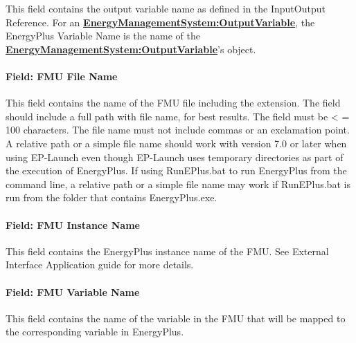 This field contains the output variable name as defined in the InputOutput Reference. For an \textbf{\hyperref[energymanagementsystemoutputvariable]{EnergyManagementSystem:OutputVariable}}, the EnergyPlus Variable Name is the name of the \textbf{\hyperref[energymanagementsystemoutputvariable]{EnergyManagementSystem:OutputVariable}}'s object.

\paragraph{Field: FMU File Name}\label{field-fmu-file-name-1}

This field contains the name of the FMU file including the extension. The field should include a full path with file name, for best results. The field must be \textless{} = 100 characters. The file name must not include commas or an exclamation point. A relative path or a simple file name should work with version 7.0 or later when using EP-Launch even though EP-Launch uses temporary directories as part of the execution of EnergyPlus. If using RunEPlus.bat to run EnergyPlus from the command line, a relative path or a simple file name may work if RunEPlus.bat is run from the folder that contains EnergyPlus.exe.

\paragraph{Field: FMU Instance Name}\label{field-fmu-instance-name}

This field contains the EnergyPlus instance name of the FMU. See External Interface Application guide for more details.

\paragraph{Field: FMU Variable Name}\label{field-fmu-variable-name}

This field contains the name of the variable in the FMU that will be mapped to the corresponding variable in EnergyPlus.

